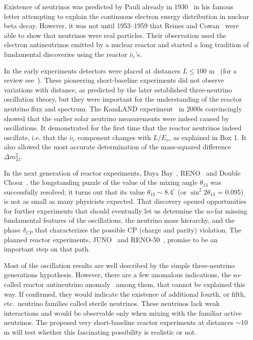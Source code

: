 \documentclass[aps,twocolumn,preprintnumbers,amsmath,superscriptaddress,amssymb,floats,nofootinbib]{revtex4-1}
\begin{document}
Existence of neutrinos was predicted by Pauli already in 1930~\cite{Pauli30} in his famous letter attempting to explain the continuous electron energy 
distribution in nuclear beta decay. 
However, it was not until 1953--1959 that Reines and Cowan~\cite{Reines53,Cowan56,Reines59} were able to show that neutrinos were real particles. 
Their observation used the electron antineutrinos emitted by a nuclear reactor and started a long tradition of fundamental discoveries using the reactor $\bar{\nu}_e$'s.

In the early experiments detectors were placed at distances $L \le 100$ m~\cite{ILL,Gosgen,Rovno,Krasnoyarsk,SRP,Bugey4,Bugey3} (for a review see~\cite{Bemporad02}). 
These pioneering short-baseline experiments did not observe variations with distance, as predicted by the later established three-neutrino oscillation theory, 
but they were important for the understanding of the reactor neutrino flux and spectrum.
The KamLAND experiment~\cite{Kamland03,Kamland05,Kamland08} in 2000s convincingly showed that the earlier solar neutrino measurements were indeed caused by oscillations. 
It demonstrated for the first time that the reactor neutrinos indeed oscillate, i.e. that the $\bar{\nu}_e$ component changes with $L/E_{\nu}$, as explained in Box 1.
It also allowed the most accurate determination of the mass-squared difference $\Delta m^2_{21}$.  

In the next generation of reactor experiments, Daya Bay~\cite{Dayabay,Dayabay14}, RENO~\cite{Reno}  and Double Chooz~\cite{DChooz,DChooz14}, the longstanding puzzle of the
value of the mixing angle $\theta_{13}$ was successfully resolved; it turns out that its value $\theta_{13} \sim 8.4^\circ$ (or $\sin^2 2\theta_{13}$ = 0.095)
is not as small as many physicists expected. That discovery opened opportunities for further experiments that should eventually 
let us determine the so-far missing fundamental features of the oscillations, the neutrino mass hierarchy, and the phase $\delta_{CP}$ that characterizes the possible CP (charge and parity) violation. 
The planned reactor experiments, JUNO~\cite{He-NuFact13} and RENO-50~\cite{RENO-50}, promise to be an important step on that path.

Most of the oscillation results are well described by the simple three-neutrino generations hypothesis. However, there are a few anomalous indications,
the so-called reactor antineutrino anomaly~\cite{Mention} among them, that cannot be explained this way. If confirmed, they would indicate the existence of additional
fourth, or fifth, etc.~neutrino families called sterile neutrinos. 
These neutrinos lack weak interactions and would be observable only when mixing with the familiar active neutrinos.  
The proposed very short-baseline reactor experiments at distances $\sim$10 m will test whether this fascinating possibility is realistic or not.
\end{document}
